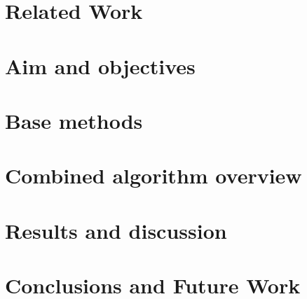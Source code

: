 \documentclass[a4paper,oneside]{bth}
\begin{document}
\chapter{Related Work}


\chapter{Aim and objectives}


\chapter{Base methods}


\chapter{Combined algorithm overview}


\chapter{Results and discussion}


\chapter{Conclusions and Future Work}



\nocite{*}

\end{document}
